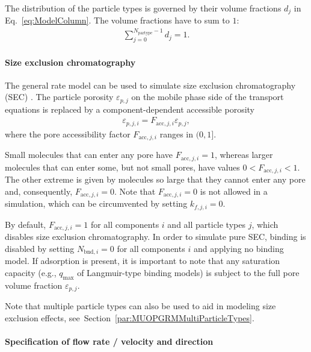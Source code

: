 The distribution of the particle types is governed by their volume fractions $d_j$ in Eq.~\eqref{eq:ModelColumn}.
The volume fractions have to sum to $1$:
\begin{align*}
	\sum_{j=0}^{N_{\text{partype}} - 1} d_j = 1.
\end{align*}

\paragraph{Size exclusion chromatography}
\label{par:MUOPGRMSizeExclusion}

The general rate model can be used to simulate size exclusion chromatography (SEC) \cite{Gu1995}. 
The particle porosity $\varepsilon_{p,j}$ on the mobile phase side of the transport equations is replaced by a component-dependent accessible porosity
\begin{align}
	\varepsilon_{p,j,i} = F_{\text{acc},j,i} \varepsilon_{p,j},
\end{align}
where the pore accessibility factor $F_{\text{acc},j,i}$ ranges in $(0, 1]$.

Small molecules that can enter any pore have $F_{\text{acc},j,i} = 1$, whereas larger molecules that can enter some, but not small pores, have values $0 < F_{\text{acc},j,i} < 1$.
The other extreme is given by molecules so large that they cannot enter any pore and, consequently, $F_{\text{acc},j,i} = 0$.
Note that $F_{\text{acc},j,i} = 0$ is not allowed in a simulation, which can be circumvented by setting $k_{f,j,i} = 0$.

By default, $F_{\text{acc},j,i} = 1$ for all components $i$ and all particle types $j$, which disables size exclusion chromatography.
In order to simulate pure SEC, binding is disabled by setting $N_{\text{bnd},i} = 0$ for all components $i$ and applying no binding model.
If adsorption is present, it is important to note that any saturation capacity (e.g., $q_{\text{max}}$ of Langmuir-type binding models) is subject to the full pore volume fraction $\varepsilon_{p,j}$.

Note that multiple particle types can also be used to aid in modeling size exclusion effects, see~Section~\ref{par:MUOPGRMMultiParticleTypes}.

\paragraph{Specification of flow rate / velocity and direction}
\label{par:MUOPGRMflow}

